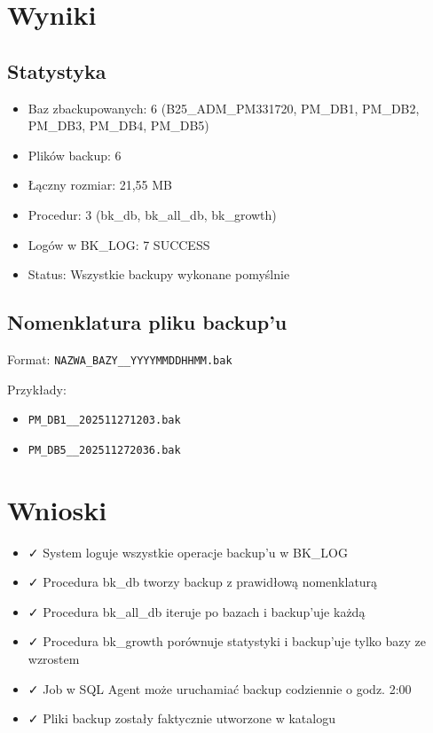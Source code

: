 \documentclass[a4paper,11pt]{article}
\begin{document}
	\section{Wyniki}
	
	\subsection{Statystyka}
	
	\begin{itemize}
		\item Baz zbackupowanych: 6 (B25\_ADM\_PM331720, PM\_DB1, PM\_DB2, PM\_DB3, PM\_DB4, PM\_DB5)
		\item Plików backup: 6
		\item Łączny rozmiar: 21,55 MB
		\item Procedur: 3 (bk\_db, bk\_all\_db, bk\_growth)
		\item Logów w BK\_LOG: 7 SUCCESS
		\item Status: Wszystkie backupy wykonane pomyślnie
	\end{itemize}
	
	\subsection{Nomenklatura pliku backup'u}
	
	Format: \texttt{NAZWA\_BAZY\_\_YYYYMMDDHHMM.bak}
	
	Przykłady:
	\begin{itemize}
		\item \texttt{PM\_DB1\_\_202511271203.bak}
		\item \texttt{PM\_DB5\_\_202511272036.bak}
	\end{itemize}
	
	\section{Wnioski}
	
	\begin{itemize}
		\item ✓ System loguje wszystkie operacje backup'u w BK\_LOG
		\item ✓ Procedura bk\_db tworzy backup z prawidłową nomenklaturą
		\item ✓ Procedura bk\_all\_db iteruje po bazach i backup'uje każdą
		\item ✓ Procedura bk\_growth porównuje statystyki i backup'uje tylko bazy ze wzrostem
		\item ✓ Job w SQL Agent może uruchamiać backup codziennie o godz. 2:00
		\item ✓ Pliki backup zostały faktycznie utworzone w katalogu
	\end{itemize}
	
\end{document}
